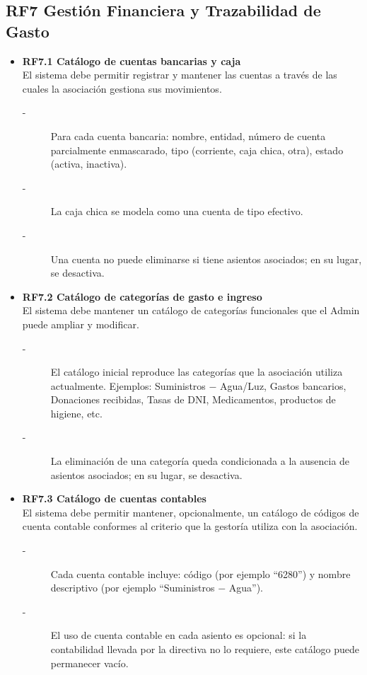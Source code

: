 \subsection*{RF7 Gestión Financiera y Trazabilidad de Gasto}
\begin{itemize}
    \item \textbf{RF7.1 Catálogo de cuentas bancarias y caja} \\
    El sistema debe permitir registrar y mantener las cuentas a través de
    las cuales la asociación gestiona sus movimientos.
    \begin{description}
        \item[-] Para cada cuenta bancaria: nombre, entidad, número de cuenta 
        parcialmente enmascarado, tipo (corriente, caja chica, otra), estado (activa, inactiva).
        \item[-] La caja chica se modela como una cuenta de tipo efectivo.
        \item[-] Una cuenta no puede eliminarse si tiene asientos asociados; en su lugar, se desactiva. 
    \end{description}

    \item \textbf{RF7.2 Catálogo de categorías de gasto e ingreso} \\
    El sistema debe mantener un catálogo de categorías funcionales que el
    Admin puede ampliar y modificar.
    \begin{description}
        \item[-] El catálogo inicial reproduce las categorías que la asociación utiliza actualmente. Ejemplos: Suministros $-$ Agua/Luz, Gastos
        bancarios, Donaciones recibidas, Tasas de DNI, Medicamentos, productos de higiene, etc.
        \item[-] La eliminación de una categoría queda condicionada a la ausencia de asientos asociados; en su lugar, se desactiva.
    \end{description}

    \item \textbf{RF7.3 Catálogo de cuentas contables} \\
    El sistema debe permitir mantener, opcionalmente, un catálogo de
    códigos de cuenta contable conformes al criterio que la gestoría
    utiliza con la asociación.
\begin{description}
    \item[-] Cada cuenta contable incluye: código (por ejemplo ``6280'') y nombre descriptivo (por ejemplo ``Suministros $-$ Agua'').
    \item[-] El uso de cuenta contable en cada asiento es opcional: si la contabilidad llevada por la directiva no lo requiere, este catálogo puede permanecer vacío.
\end{description}


\end{itemize}
